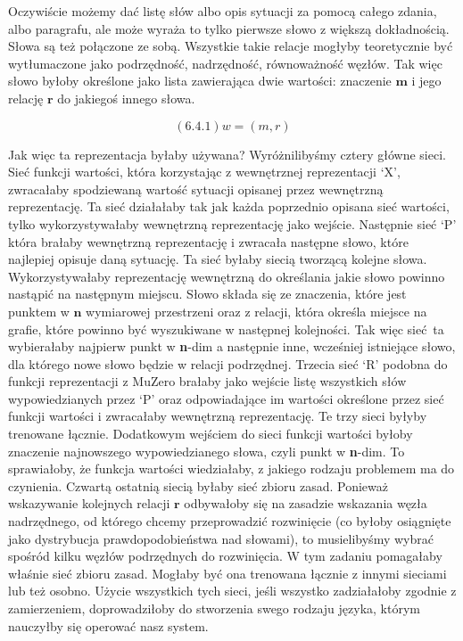 Oczywiście możemy dać listę słów albo opis sytuacji za pomocą całego zdania, albo paragrafu, ale może wyraża to tylko pierwsze słowo z większą dokładnością. Słowa są też połączone ze sobą. Wszystkie takie relacje mogłyby teoretycznie być wytłumaczone jako podrzędność, nadrzędność, równoważność węzłów. Tak więc słowo byłoby określone jako lista zawierająca dwie wartości: znaczenie $\boldsymbol{m}$ i jego relację $\boldsymbol{r}$ do jakiegoś innego słowa.

\begin{equation}
(6.4.1) w = (m, r)
\end{equation}

Jak więc ta reprezentacja byłaby używana? Wyróżnilibyśmy cztery główne sieci. Sieć funkcji wartości, która korzystając z wewnętrznej reprezentacji ‘X’, zwracałaby spodziewaną wartość sytuacji opisanej przez wewnętrzną reprezentację. Ta sieć działałaby tak jak każda poprzednio opisana sieć wartości, tylko wykorzystywałaby wewnętrzną reprezentację jako wejście. Następnie sieć ‘P’ która brałaby wewnętrzną reprezentację i zwracała następne słowo, które najlepiej opisuje daną sytuację. Ta sieć byłaby siecią tworzącą kolejne słowa. Wykorzystywałaby reprezentację wewnętrzną do określania jakie słowo powinno nastąpić na następnym miejscu. Słowo składa się ze znaczenia, które jest punktem w $\boldsymbol{n}$ wymiarowej przestrzeni oraz z relacji, która określa miejsce na grafie, które powinno być wyszukiwane w następnej kolejności. Tak więc sieć ta wybierałaby najpierw punkt w \textbf{n}-dim a następnie inne, wcześniej istniejące słowo, dla którego nowe słowo będzie w relacji podrzędnej. Trzecia sieć ‘R’ podobna do funkcji reprezentacji z MuZero brałaby jako wejście listę wszystkich słów wypowiedzianych przez ‘P’ oraz odpowiadające im wartości określone przez sieć funkcji wartości i zwracałaby wewnętrzną reprezentację. Te trzy sieci byłyby trenowane łącznie. Dodatkowym wejściem do sieci funkcji wartości byłoby znaczenie najnowszego wypowiedzianego słowa, czyli punkt w \textbf{n}-dim. To sprawiałoby, że funkcja wartości wiedziałaby, z jakiego rodzaju problemem ma do czynienia. Czwartą ostatnią siecią byłaby sieć zbioru zasad. Ponieważ wskazywanie kolejnych relacji $\boldsymbol{r}$ odbywałoby się na zasadzie wskazania węzła nadrzędnego, od którego chcemy przeprowadzić rozwinięcie (co byłoby osiągnięte jako dystrybucja prawdopodobieństwa nad słowami), to musielibyśmy wybrać spośród kilku węzłów podrzędnych do rozwinięcia. W tym zadaniu pomagałaby właśnie sieć zbioru zasad. Mogłaby być ona trenowana łącznie z innymi sieciami lub też osobno. Użycie wszystkich tych sieci, jeśli wszystko zadziałałoby zgodnie z zamierzeniem, doprowadziłoby do stworzenia swego rodzaju języka, którym nauczyłby się operować nasz system.\newline

